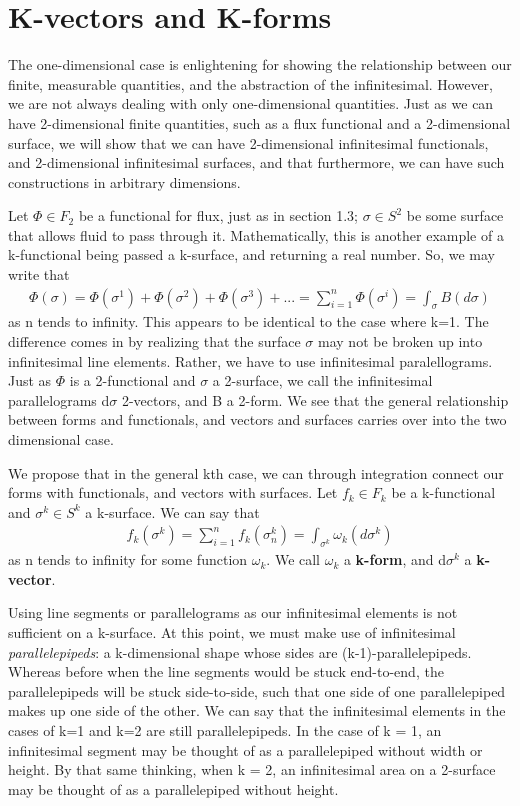 \documentclass{book}
\begin{document}
\section{K-vectors and K-forms}



The one-dimensional case is enlightening for showing the relationship between our finite, measurable quantities, and the abstraction of the infinitesimal. However, we are not always dealing with only one-dimensional quantities. Just as we can have 2-dimensional finite quantities, such as a flux functional and a 2-dimensional surface, we will show that we can have 2-dimensional infinitesimal functionals, and 2-dimensional infinitesimal surfaces, and that furthermore, we can have such constructions in arbitrary dimensions. 

Let $\Phi \in F_2$ be a functional for flux, just as in section 1.3; $\sigma \in S^2$ be some surface that allows fluid to pass through it. Mathematically, this is another example of a k-functional being passed a k-surface, and returning a real number. So, we may write that \begin{gather}\Phi(\sigma) = \Phi(\sigma^1) + \Phi(\sigma^2) + \Phi(\sigma^3) + ... = \sum_{i=1}^n \Phi(\sigma^i) = \int_\sigma B(d\sigma)\end{gather} as n tends to infinity. This appears to be identical to the case where k=1. The difference comes in by realizing that the surface $\sigma$ may not be broken up into infinitesimal line elements. Rather, we have to use infinitesimal paralellograms. Just as $\Phi$ is a 2-functional and $\sigma$ a 2-surface, we call the infinitesimal parallelograms d$\sigma$ 2-vectors, and B a 2-form. We see that the general relationship between forms and functionals, and vectors and surfaces carries over into the two dimensional case.  


We propose that in the general kth case, we can through integration connect our forms with functionals, and vectors with surfaces. Let $f_k \in F_k$ be a k-functional and $\sigma^k \in S^k$ a k-surface. We can say that \begin{gather}f_k(\sigma^k) = \sum_{i=1}^n f_k(\sigma^k_n) = \int_{\sigma^k} \omega_k(d\sigma^k)\end{gather} as n tends to infinity for some function $\omega_k$. We call $\omega_k$ a \textbf{k-form}, and d$\sigma^k$ a \textbf{k-vector}. 

Using line segments or parallelograms as our infinitesimal elements is not sufficient on a k-surface. At this point, we must make use of infinitesimal \emph{parallelepipeds}: a k-dimensional shape whose sides are (k-1)-parallelepipeds. Whereas before when the line segments would be stuck end-to-end, the parallelepipeds will be stuck side-to-side, such that one side of one parallelepiped makes up one side of the other. We can say that the infinitesimal elements in the cases of k=1 and k=2 are still parallelepipeds. In the case of k = 1, an infinitesimal segment may be thought of as a parallelepiped without width or height. By that same thinking, when k = 2, an infinitesimal area on a 2-surface may be thought of as a parallelepiped without height. 
\end{document}
